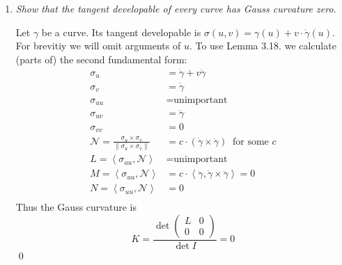 \documentclass[a4paper,11pt,notitlepage,fullpage]{article}
\newcommand{\dy}{\dot\gamma}
\newcommand{\ddy}{\ddot\gamma}
\newcommand{\la}{\left\langle}
\newcommand{\ra}{\right\rangle}
\begin{document}
\begin{enumerate}
\item \emph{Show that the tangent developable of every curve has Gauss curvature zero.}

Let $\gamma$ be a curve. Its tangent developable is $\sigma(u,v) = \gamma(u) + v\cdot\dot\gamma(u)$. For brevitiy we will omit arguments of $u$. To use Lemma 3.18. we calculate (parts of) the second fundamental form:
\begin{align*}
\sigma_u &= \dy + v\ddy \\
\sigma_v &= \dy \\
\sigma_{uu} &= \text{unimportant} \\
\sigma_{uv} &= \ddy \\
\sigma_{vv} &= 0 \\
\mathcal N = \frac{\sigma_u \times \sigma_v}{\|\sigma_u \times \sigma_v\|} &= c\cdot(\dy\times\ddy) ~\text{ for some } c\\
L = \la\sigma_{uu}, \mathcal N \ra &= \text{unimportant} \\
M = \la\sigma_{uu}, \mathcal N \ra &= c\cdot \la\ddy, \dy\times\ddy\ra = 0 \\
N = \la\sigma_{uu}, \mathcal N \ra &= 0 \\
\end{align*}
Thus the Gauss curvature is
\begin{equation*}
K = \frac{\det\left(\begin{matrix}L&0\\0&0\end{matrix}\right)}{\det I} = 0
\end{equation*}
\qed

\end{enumerate}

\newpage
\end{document}
